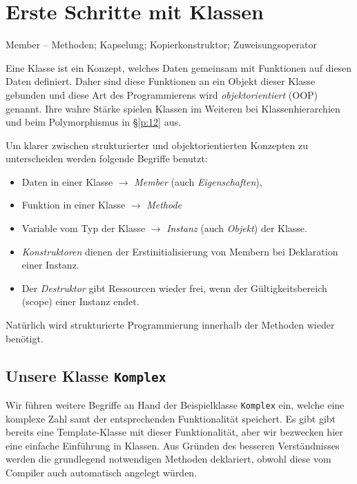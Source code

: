 \chapter{Erste Schritte mit Klassen}
\label{p:9}
%
Member -- Methoden; Kapselung; Kopierkonstruktor; Zuweisungsoperator

Eine Klasse ist ein Konzept, welches Daten gemeinsam mit Funktionen auf diesen Daten definiert.
Daher sind diese Funktionen an ein Objekt dieser Klasse gebunden und diese Art des
Programmierens wird \emph{objektorientiert} (OOP) genannt.
Ihre wahre Stärke spielen Klassen im Weiteren bei Klassenhierarchien und beim
Polymorphismus in \S\ref{p:12} aus.

Um klarer zwischen strukturierter und objektorientierten Konzepten zu unterscheiden werden
folgende Begriffe benutzt:
\begin{itemize}
    \item Daten in einer Klasse $\longrightarrow$ \emph{Member} (auch \emph{Eigenschaften}),
    \item Funktion in einer Klasse $\longrightarrow$ \emph{Methode}
    \item Variable vom Typ der Klasse  $\longrightarrow$ \emph{Instanz}
    (auch \emph{Objekt}) der Klasse.
    \item \emph{Konstruktoren} dienen der Erstinitialisierung von Membern bei Deklaration einer Instanz.
    \item Der \emph{Destruktor} gibt Ressourcen wieder frei, wenn der Gültigkeitsbereich (scope)
      einer Instanz endet.
\end{itemize}
Natürlich wird strukturierte Programmierung innerhalb der Methoden wieder benötigt.

\section{Unsere Klasse \texttt{Komplex}}
\label{p:9.1}
%
Wir führen weitere Begriffe an Hand der Beispielklasse \texttt{Komplex} ein, welche
eine komplexe Zahl samt der entsprechenden Funktionalität speichert.
Es gibt gibt bereits eine Template-Klasse
mit dieser Funktionalität, aber wir bezwecken hier eine einfache Einführung in Klassen.
Aus Gründen des besseren Verständnisses werden die grundlegend notwendigen Methoden
deklariert, obwohl diese vom Compiler auch automatisch angelegt würden.

